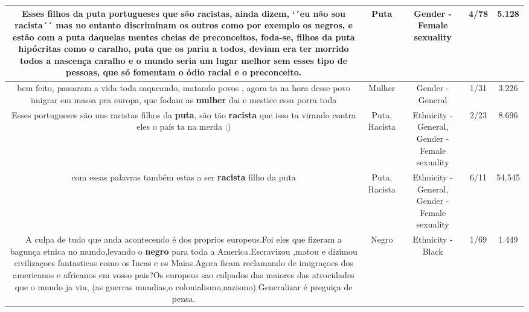 \documentclass[11pt]{article}
\newlength\mylength
\begin{document}
\begin{center}
\begin{longtable}{|C{.65\mylength}|C{.30\mylength}|C{.12\mylength}|C{.12\mylength}|C{.12\mylength}|}
  \small Esses filhos da \textbf{puta} portugueses que são racistas, ainda dizem, `´eu não sou racista´´ mas no entanto discriminam os outros como por exemplo os negros, e estão com a \textbf{puta} daquelas mentes cheias de preconceitos, foda-se, filhos da \textbf{puta} hipócritas como o caralho, \textbf{puta} que os pariu a todos, deviam era ter morrido todos a nascença caralho e o mundo seria um lugar melhor sem esses tipo de pessoas, que só fomentam o ódio racial e o preconceito.\normalsize   & Puta & Gender - Female sexuality & 4/78 & 5.128 \\  \hline
  \small bem feito, passaram a vida toda saqueando, matando povos , agora ta na hora desse povo imigrar em massa pra europa, que fodam as \textbf{mulher} dai e mestice essa porra toda\normalsize   & Mulher & Gender - General & 1/31 & 3.226 \\  \hline
  \small Esses portugueses são uns racistas filhos da \textbf{puta}, são tão \textbf{racista} que isso ta virando contra eles o país ta na merda ;)\normalsize   & Puta, Racista & Ethnicity - General, Gender - Female sexuality & 2/23 & 8.696 \\  \hline
  \small com essas palavras também estas a ser \textbf{racista} filho da puta\normalsize   & Puta, Racista & Ethnicity - General, Gender - Female sexuality & 6/11 & 54.545 \\  \hline
  \small A culpa de tudo que anda acontecendo é dos proprios europeus.Foi eles que fizeram a bagunça etnica no mundo,levando o \textbf{negro} para toda a America.Escravizou ,matou e dizimou civilizaçoes fantasticas como os Incas e os Maias.Agora ficam reclamando de imigraçoes dos americanos e africanos em vosso pais?Os europeus sao culpados das maiores das atrocidades que o mundo ja viu, (as guerras mundias,o colonialismo,nazismo).Generalizar é preguiça de pensa.\normalsize   & Negro & Ethnicity - Black & 1/69 & 1.449 \\  \hline

\end{longtable}
\end{center}
\end{document}
